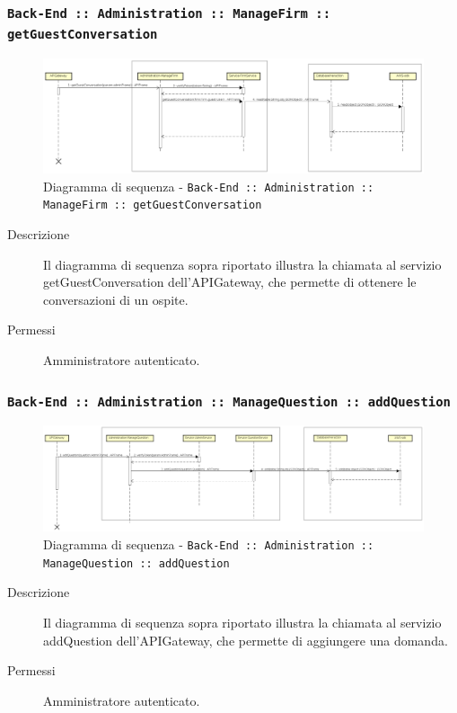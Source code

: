\documentclass[../DefinizioneDiProdotto.tex]{subfiles}
\begin{document}
		\newpage
		\subsubsection{\texttt{Back-End :: Administration :: ManageFirm :: getGuestConversation}}
		\begin{figure}[!h]
			\centering
			\includegraphics[width=\textwidth]{DiagrammiSequenza/Back-End/manageFirm/getGuestConversation.png}
			\caption{Diagramma di sequenza - \texttt{Back-End :: Administration :: ManageFirm :: getGuestConversation }}
		\end{figure}
		\begin{description}
			\item [Descrizione] Il diagramma di sequenza sopra riportato illustra la chiamata al servizio getGuestConversation dell'APIGateway, che permette di ottenere le conversazioni di un ospite.
			\item [Permessi] Amministratore autenticato.
		\end{description}

		\subsubsection{\texttt{Back-End :: Administration :: ManageQuestion :: addQuestion}}
		\begin{figure}[!h]
			\centering
			\includegraphics[width=\textwidth]{DiagrammiSequenza/Back-End/manageQuestion/addQuestion.png}
			\caption{Diagramma di sequenza - \texttt{Back-End :: Administration :: ManageQuestion :: addQuestion }}
		\end{figure}
		\begin{description}
			\item [Descrizione] Il diagramma di sequenza sopra riportato illustra la chiamata al servizio addQuestion dell'APIGateway, che permette di aggiungere una domanda.
			\item [Permessi] Amministratore autenticato.
		\end{description}
\end{document}
